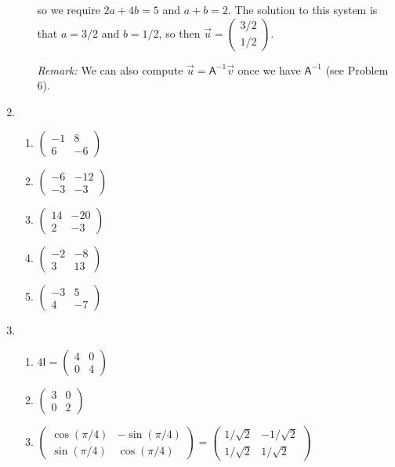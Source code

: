 \begin{enumerate}
\begin{enumerate}
\begin{equation*}
\end{equation*}
so we require $2a + 4b = 5$ and $a + b = 2$. The solution to this system is that $a = 3/2$ and $b = 1/2$, so then $\vec{u} = \begin{pmatrix} 3/2 \\ 1/2 \end{pmatrix}$.\par
\textit{Remark:} We can also compute $\vec{u} = \mathsf{A}^{-1}\vec{v}$ once we have $\mathsf{A}^{-1}$ (see Problem 6).
\end{enumerate}
\item \begin{enumerate}
\item $\begin{pmatrix} -1 & 8 \\ 6 & -6 \end{pmatrix}$
\item $\begin{pmatrix} -6 & -12 \\ -3 & -3 \end{pmatrix}$
\item $\begin{pmatrix} 14 & -20 \\ 2 & -3 \end{pmatrix}$
\item $\begin{pmatrix} -2 & -8 \\ 3 & 13 \end{pmatrix}$
\item $\begin{pmatrix} -3 & 5 \\ 4 & -7 \end{pmatrix}$
\end{enumerate}
\item \begin{enumerate}
\item $4\mathsf{I} = \begin{pmatrix} 4 & 0 \\ 0 & 4 \end{pmatrix}$
\item $\begin{pmatrix} 3 & 0 \\ 0 & 2 \end{pmatrix}$
\item $\begin{pmatrix} \cos(\pi/4) & -\sin(\pi/4) \\ \sin(\pi/4) & \cos(\pi/4) \end{pmatrix} = \begin{pmatrix} 1/\sqrt{2} & -1/\sqrt{2} \\ 1/\sqrt{2} & 1/\sqrt{2} \end{pmatrix}$

\end{enumerate}
\end{enumerate}
